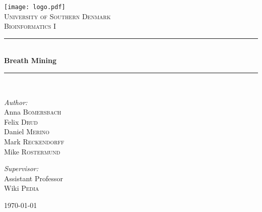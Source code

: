 \documentclass[a4paper,12pt]{article}
\newcommand{\HRule}{\rule{\linewidth}{0.5mm}}
\begin{document}
\begin{titlepage}
\begin{center}
\texttt{[image: logo.pdf]}\\[1cm]
\textsc{\LARGE University of Southern Denmark}\\[1.5cm]
\textsc{\Large Bioinformatics I}\\[0.5cm]
\HRule \\[0.4cm]
{ \huge \bfseries Breath Mining}\\[0.4cm]
\HRule \\[1.5cm]
\begin{minipage}{0.4\textwidth}
\begin{flushleft} \large
\emph{Author:}\\
Anna \textsc{Bomersbach}\\
Felix \textsc{Drud}\\
Daniel \textsc{Merino}\\
Mark \textsc{Reckendorff}\\
Mike \textsc{Rostermund}
\end{flushleft}
\end{minipage}
\begin{minipage}{0.4\textwidth}
\begin{flushright} \large
\emph{Supervisor:} \\
Assistant Professor\\Wiki \textsc{Pedia}
\end{flushright}
\end{minipage}
\vfill
{\large \today}
\end{center}
\end{titlepage}

\newpage







\end{document}
